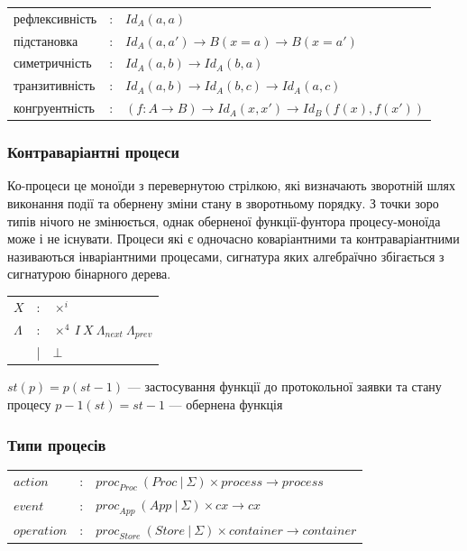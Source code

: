 \documentclass[11pt,oneside]{article}
\begin{document}
\begin{center}
\begin{tabular}{lll}
  рефлексивність &:& $Id_A(a,a)$ \\
  підстановка     &:& $Id_A(a,a') \rightarrow B(x=a) \rightarrow B(x=a')$ \\
  симетричність  &:& $Id_A(a,b) \rightarrow Id_A(b,a)$  \\
  транзитивність &:& $Id_A(a,b) \rightarrow Id_A(b,c) \rightarrow Id_A(a,c)$ \\
  конгруентність &:& $(f: A \rightarrow B) \rightarrow Id_A(x,x') \rightarrow Id_B(f(x),f(x'))$ \\
\end{tabular}
\end{center}



  \subsubsection{Контраваріантні процеси}

  Ко-процеси це моноїди з перевернутою стрілкою, які визначають зворотній шлях виконання
  події та обернену зміни стану в зворотньому порядку. З точки зоро типів нічого не змінюється,
  однак оберненої функції-фунтора процесу-моноїда може і не існувати. Процеси які є
  одночасно коваріантними та контраваріантними називаються інваріантними процесами, сигнатура яких
  алгебраїчно збігається з сигнатурою бінарного дерева.

\begin{center}
\begin{tabular}{lcl}
$X$         &:& $\times^{i}$ \\
$\Lambda$   &:& $\times^{4} \ I \ X \ \Lambda_{next} \ \Lambda_{prev}$ \\
            &|& $\bot$ \\
\end{tabular}
\end{center}

\begin{center}
$st(p) = p(st-1)$ — застосування функції до протокольної заявки та стану процесу
$p-1(st) = st-1$ — обернена функція
\end{center}

  \subsubsection{Типи процесів}

\begin{center}
\begin{tabular}{lll}
         $action$ &:& ${proc}_{Proc}\ (Proc\ |\ \Sigma) \times process \rightarrow process$ \\
         $event$  &:& ${proc}_{App}\ (App\ |\ \Sigma) \times cx \rightarrow cx$ \\
         $operation$    &:& ${proc}_{Store}\ (Store\ |\ \Sigma) \times container \rightarrow container$ \\
\end{tabular}
\end{center}
\end{document}
